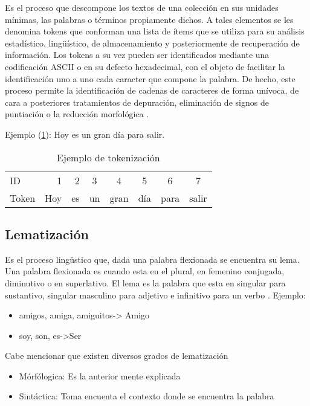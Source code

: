 Es el proceso que descompone los textos de una colección en sus unidades mínimas, las palabras
o términos propiamente dichos. A tales elementos se les denomina tokens que conforman una lista de
ítems que se utiliza para su análisis estadístico, ling{\"u}ístico, de almacenamiento y posteriormente de
recuperación de información. Los tokens a su vez pueden ser identificados mediante una codificación
ASCII o en su defecto hexadecimal, con el objeto de facilitar la identificación uno a uno cada caracter
que compone la palabra. De hecho, este proceso permite la identificación de cadenas de caracteres de
forma unívoca, de cara a posteriores tratamientos de depuración, eliminación de signos de puntiación
o la reducción morfológica \citep{CT12}.

Ejemplo  (\ref{tabla:sencilla}): Hoy es un gran día para salir.

\begin{table}[htbp]
	\begin{center}
	\begin{tabular}{|lrrccccc|}
		\hline
		ID & 1 & 2 & 3 & 4 & 5 & 6 & 7 \\ 
		Token & Hoy & es & un & gran & día & para & salir \\ \hline
		\hline
	\end{tabular}
	\caption{Ejemplo de tokenización}
	\label{tabla:sencilla}
	\end{center}
	
\end{table}


\subsection{Lematización}

Es el proceso lingüstico que, dada una palabra flexionada se encuentra su
lema. Una palabra flexionada es cuando esta en el plural, en femenino conjugada,
diminutivo o en superlativo. El lema es la palabra que esta en singular para
sustantivo, singular masculino para adjetivo e infinitivo para un verbo \citep{CT13}. Ejemplo:

	\begin{itemize}
		\item amigos, amiga, amiguitos-> Amigo
		\item soy, son, es->Ser
	\end{itemize}

Cabe mencionar que existen diversos grados de lematización

	\begin{itemize}
		\item Mórfólogica: Es la anterior mente explicada
		\item Sintáctica: Toma encuenta el contexto donde se encuentra la palabra

	\end{itemize}

